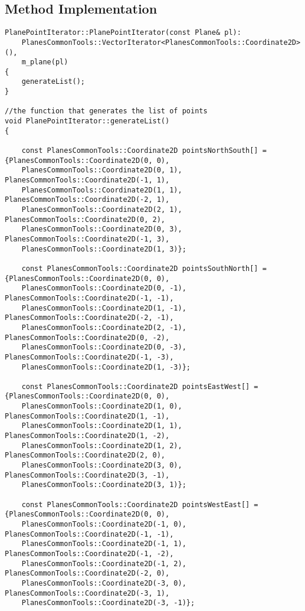 \subsection {Method Implementation}
\begin{lstlisting}
PlanePointIterator::PlanePointIterator(const Plane& pl):
    PlanesCommonTools::VectorIterator<PlanesCommonTools::Coordinate2D>(),
    m_plane(pl)
{
    generateList();
}

//the function that generates the list of points
void PlanePointIterator::generateList()
{

    const PlanesCommonTools::Coordinate2D pointsNorthSouth[] = {PlanesCommonTools::Coordinate2D(0, 0), 
    PlanesCommonTools::Coordinate2D(0, 1), PlanesCommonTools::Coordinate2D(-1, 1),
    PlanesCommonTools::Coordinate2D(1, 1), PlanesCommonTools::Coordinate2D(-2, 1), 
    PlanesCommonTools::Coordinate2D(2, 1), PlanesCommonTools::Coordinate2D(0, 2),
    PlanesCommonTools::Coordinate2D(0, 3), PlanesCommonTools::Coordinate2D(-1, 3),
    PlanesCommonTools::Coordinate2D(1, 3)};

    const PlanesCommonTools::Coordinate2D pointsSouthNorth[] = {PlanesCommonTools::Coordinate2D(0, 0), 
    PlanesCommonTools::Coordinate2D(0, -1), PlanesCommonTools::Coordinate2D(-1, -1),
    PlanesCommonTools::Coordinate2D(1, -1), PlanesCommonTools::Coordinate2D(-2, -1),
    PlanesCommonTools::Coordinate2D(2, -1), PlanesCommonTools::Coordinate2D(0, -2), 
    PlanesCommonTools::Coordinate2D(0, -3), PlanesCommonTools::Coordinate2D(-1, -3),
    PlanesCommonTools::Coordinate2D(1, -3)};

    const PlanesCommonTools::Coordinate2D pointsEastWest[] = {PlanesCommonTools::Coordinate2D(0, 0), 
    PlanesCommonTools::Coordinate2D(1, 0), PlanesCommonTools::Coordinate2D(1, -1),
    PlanesCommonTools::Coordinate2D(1, 1), PlanesCommonTools::Coordinate2D(1, -2), 
    PlanesCommonTools::Coordinate2D(1, 2), PlanesCommonTools::Coordinate2D(2, 0), 
    PlanesCommonTools::Coordinate2D(3, 0), PlanesCommonTools::Coordinate2D(3, -1),
    PlanesCommonTools::Coordinate2D(3, 1)};

    const PlanesCommonTools::Coordinate2D pointsWestEast[] = {PlanesCommonTools::Coordinate2D(0, 0), 
    PlanesCommonTools::Coordinate2D(-1, 0), PlanesCommonTools::Coordinate2D(-1, -1),
    PlanesCommonTools::Coordinate2D(-1, 1), PlanesCommonTools::Coordinate2D(-1, -2), 
    PlanesCommonTools::Coordinate2D(-1, 2), PlanesCommonTools::Coordinate2D(-2, 0), 
    PlanesCommonTools::Coordinate2D(-3, 0), PlanesCommonTools::Coordinate2D(-3, 1),
    PlanesCommonTools::Coordinate2D(-3, -1)};


\end{lstlisting}
